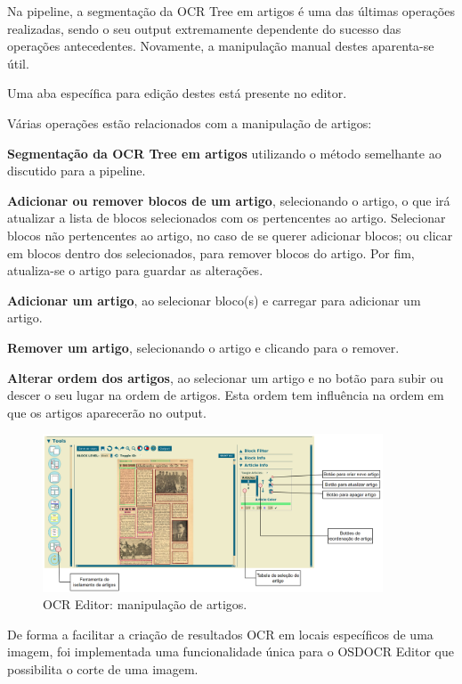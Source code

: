 

Na pipeline, a segmentação da OCR Tree em artigos é uma das últimas operações realizadas, sendo o seu output extremamente dependente do sucesso das operações antecedentes. Novamente, a manipulação manual destes aparenta-se útil.

Uma aba específica para edição destes está presente no editor.

Várias operações estão relacionados com a manipulação de artigos:

\textbf{Segmentação da OCR Tree em artigos} utilizando o método semelhante ao discutido para a pipeline.


\textbf{Adicionar ou remover blocos de um artigo}, selecionando o artigo, o que irá atualizar a lista de blocos selecionados com os pertencentes ao artigo. Selecionar blocos não pertencentes ao artigo, no caso de se querer adicionar blocos; ou clicar em blocos dentro dos selecionados, para remover blocos do artigo. Por fim, atualiza-se o artigo para guardar as alterações.

\textbf{Adicionar um artigo}, ao selecionar bloco(s) e carregar para adicionar um artigo.


\textbf{Remover um artigo}, selecionando o artigo e clicando para o remover.

\textbf{Alterar ordem dos artigos}, ao selecionar um artigo e no botão para subir ou descer o seu lugar na ordem de artigos. Esta ordem tem influência na ordem em que os artigos aparecerão no output.

\begin{figure}[H]
	\centering
	\includegraphics[width=0.9\textwidth]{images/ilustracoes/ocr_editor_articles.png}
	\caption{OCR Editor: manipulação de artigos.}
	\label{fig:ocr_editor_articles}
\end{figure}



De forma a facilitar a criação de resultados OCR em locais específicos de uma imagem, foi implementada uma funcionalidade única para o OSDOCR Editor que possibilita o corte de uma imagem.

